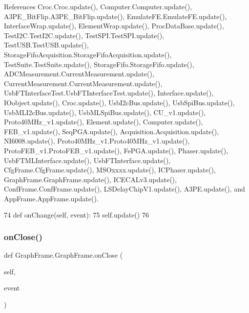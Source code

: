 References Croc.\+Croc.\+update(), Computer.\+Computer.\+update(), A3\+P\+E\+\_\+\+Bit\+Flip.\+A3\+P\+E\+\_\+\+Bit\+Flip.\+update(), Emulate\+F\+E.\+Emulate\+F\+E.\+update(), Interface\+Wrap.\+update(), Element\+Wrap.\+update(), Proc\+Data\+Base.\+update(), Test\+I2\+C.\+Test\+I2\+C.\+update(), Test\+S\+P\+I.\+Test\+S\+P\+I.\+update(), Test\+U\+S\+B.\+Test\+U\+S\+B.\+update(), Storage\+Fifo\+Acquisition.\+Storage\+Fifo\+Acquisition.\+update(), Test\+Suite.\+Test\+Suite.\+update(), Storage\+Fifo.\+Storage\+Fifo.\+update(), A\+D\+C\+Measurement.\+Current\+Measurement.\+update(), Current\+Measurement.\+Current\+Measurement.\+update(), Usb\+F\+T\+Interface\+Test.\+Usb\+F\+T\+Interface\+Test.\+update(), Interface.\+update(), I\+Oobject.\+update(), Croc.\+update(), Usb\+I2c\+Bus.\+update(), Usb\+Spi\+Bus.\+update(), Usb\+M\+L\+I2c\+Bus.\+update(), Usb\+M\+L\+Spi\+Bus.\+update(), C\+U\+\_\+v1.\+update(), Proto40\+M\+Hz\+\_\+v1.\+update(), Element.\+update(), Computer.\+update(), F\+E\+B\+\_\+v1.\+update(), Seq\+P\+G\+A.\+update(), Acquisition.\+Acquisition.\+update(), N\+I6008.\+update(), Proto40\+M\+Hz\+\_\+v1.\+Proto40\+M\+Hz\+\_\+v1.\+update(), Proto\+F\+E\+B\+\_\+v1.\+Proto\+F\+E\+B\+\_\+v1.\+update(), Fe\+P\+G\+A.\+update(), Phaser.\+update(), Usb\+F\+T\+M\+L\+Interface.\+update(), Usb\+F\+T\+Interface.\+update(), Cfg\+Frame.\+Cfg\+Frame.\+update(), M\+S\+Oxxxx.\+update(), I\+C\+Phaser.\+update(), Graph\+Frame.\+Graph\+Frame.\+update(), I\+C\+E\+C\+A\+Lv3.\+update(), Conf\+Frame.\+Conf\+Frame.\+update(), L\+S\+Delay\+Chip\+V1.\+update(), A3\+P\+E.\+update(), and App\+Frame.\+App\+Frame.\+update().


\begin{DoxyCode}
74     \textcolor{keyword}{def }onChange(self, event):
75         self.update()
76 
\end{DoxyCode}
\mbox{\label{classGraphFrame_1_1GraphFrame_a6c2fa99d2cdb9a5a943daef19dae4e83}} 
\subsubsection{\texorpdfstring{on\+Close()}{onClose()}}
{\footnotesize\ttfamily def Graph\+Frame.\+Graph\+Frame.\+on\+Close (\begin{DoxyParamCaption}\item[{}]{self,  }\item[{}]{event }\end{DoxyParamCaption})}



